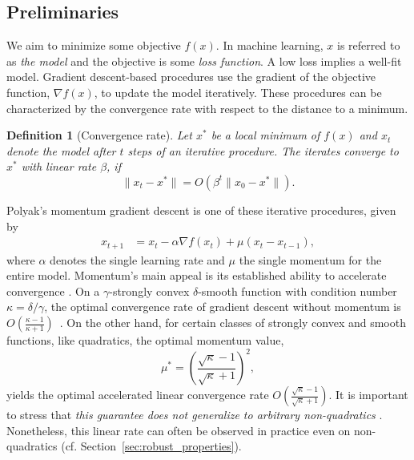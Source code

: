 \documentclass{article} %
\newtheorem{definition}[theorem]{Definition}
\begin{document}


\vspace{-0.5em}
\subsection{Preliminaries}
\label{sec:robust_preliminaries}
We aim to minimize some objective $f(x)$.
In machine learning, $x$ is referred to as {\em the model} and the objective is some {\em loss function}.
A low loss implies a well-fit model.
Gradient descent-based procedures use the gradient of the objective function, $\nabla f(x)$, to update the model iteratively.
These procedures can be characterized by the convergence rate with respect to the distance to a minimum.
\begin{definition} [Convergence rate]
	Let $x^*$ be a local minimum of $f(x)$ and $x_t$ denote the model after $t$ steps of an iterative procedure. %
The iterates converge to $x^*$ with linear rate $\beta$,
	if \[ \| x_{t} - x^* \| = O(\beta^t \| x_0 - x^* \|).\]
\end{definition}
Polyak's momentum gradient descent \citep{polyak1964some} is one of these iterative procedures, given by
\begin{align}
	x_{t+1}  &= x_t - \alpha \nabla f(x_t) + \mu (x_t - x_{t-1}),
	\label{eqn:momentum_gd}
\end{align} 
where $\alpha$ denotes the single learning rate and $\mu$ the single momentum for the entire model.   
Momentum's main appeal is its established ability to {accelerate convergence} \citep{polyak1964some}. 
On a $\gamma$-strongly convex $\delta$-smooth function with condition number $\kappa=\delta/\gamma$, the optimal convergence rate of gradient descent without momentum
is $O(\frac{\kappa-1}{\kappa+1})$~\citep{nesterov2013introductory}.
On the other hand, for certain classes of strongly convex and smooth functions, like quadratics,
 the optimal momentum value,
\begin{equation}
	\mu^* = \left(\frac{\sqrt{\kappa}-1}{\sqrt{\kappa}+1}\right)^2,
	\label{eqn:optimal_momentum}
\end{equation}
yields the optimal accelerated linear convergence rate $O(\frac{\sqrt{\kappa}-1}{\sqrt{\kappa}+1})$.
It is important to stress that 
{\em this guarantee does not generalize to arbitrary non-quadratics} \citep{lessard2016analysis}.
Nonetheless, this linear rate can often be observed in practice even on non-quadratics (cf. Section~\ref{sec:robust_properties}).
\end{document}
